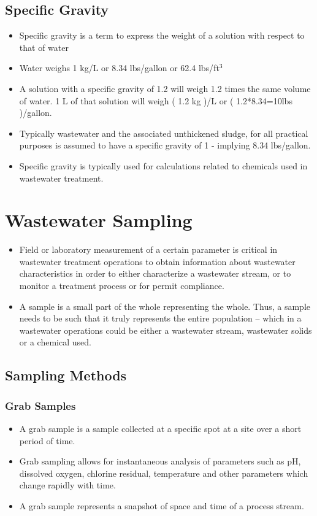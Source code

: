 \subsection{Specific Gravity}				
			\begin{itemize}
				\item Specific gravity is a term to express the weight of a solution with respect to that of water
				\item Water weighs 1 kg/L or 8.34 lbs/gallon or 62.4 lbs/ft$^3$
				\item A solution with a specific gravity of 1.2 will weigh 1.2 times the same volume of water.  1 L of that solution will weigh ( 1.2 kg )/L  or  ( 1.2*8.34=10lbs )/gallon.
				\item Typically wastewater and the associated unthickened sludge, for all practical purposes is assumed to have a specific gravity of 1 - implying 8.34 lbs/gallon.
				\item Specific gravity is typically used for calculations related to chemicals used in wastewater treatment.
			\end{itemize}

\section{Wastewater Sampling} 		
		\begin{itemize}
			\item Field or laboratory measurement of a certain parameter is critical in wastewater treatment operations to obtain information about wastewater characteristics in order to either characterize a wastewater stream, or to monitor a treatment process or for permit compliance.  
			\item A sample is a small part of the whole representing the whole.  Thus, a sample needs to be such that it truly represents the entire population – which in a wastewater operations could be either a wastewater stream, wastewater solids or a chemical used.
		\end{itemize}
		
\subsection{Sampling Methods}
\subsubsection{Grab Samples}
				\begin{itemize}
					\item A grab sample is a sample collected at a specific spot at a site over a short period of time.  
					\item Grab sampling allows for instantaneous analysis of parameters such as pH, dissolved oxygen, chlorine residual, temperature and other parameters which change rapidly with time.
					\item A grab sample represents a snapshot of space and time of a process stream.
					\end{itemize}
